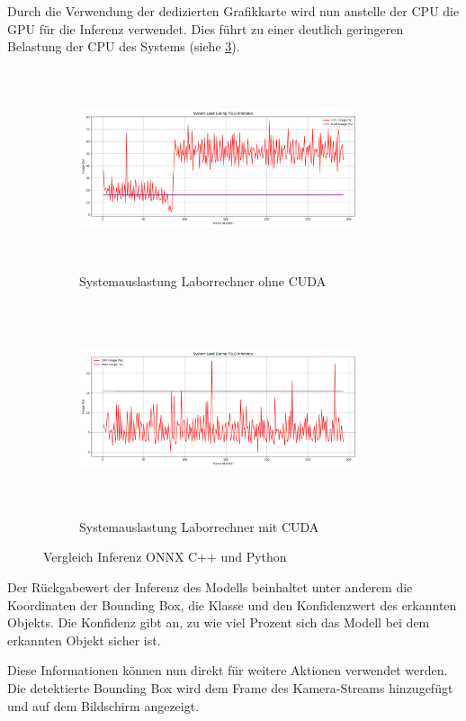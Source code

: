 Durch die Verwendung der dedizierten Grafikkarte wird nun anstelle der CPU die GPU für die Inferenz verwendet. Dies führt zu einer deutlich geringeren Belastung der CPU des Systems (siehe \ref{tab:CPU und RAM-Auslastung CPU vs CUDA}).

\begin{figure}[h!]
\centering
\begin{subfigure}[b]{\textwidth}
  \centering
  \includegraphics[width=0.9\textwidth,height=5.9cm,keepaspectratio]{images/system_load_plot_CPU_Laborrechner.png}
  \caption{Systemauslastung Laborrechner ohne CUDA}
  \label{fig:CPU und RAM-Auslastung ohne CUDA}
\end{subfigure}
\hfill
\begin{subfigure}[b]{\textwidth}
  \centering
  \includegraphics[width=0.9\textwidth,height=6.2cm,keepaspectratio]{images/system_load_plot_CUDA.png}
  \caption{Systemauslastung Laborrechner mit CUDA}
  \label{fig:CPU und RAM-Auslastung mit CUDA}
\end{subfigure}
\caption{Vergleich Inferenz ONNX C++ und Python}
\label{tab:CPU und RAM-Auslastung CPU vs CUDA}
\end{figure}

\newpage

Der Rückgabewert der Inferenz des Modells beinhaltet unter anderem die Koordinaten der Bounding Box, die Klasse und den Konfidenzwert des erkannten Objekts. Die Konfidenz gibt an, zu wie viel Prozent sich das Modell bei dem erkannten Objekt sicher ist. \cite{InferenzResults} 

Diese Informationen können nun direkt für weitere Aktionen verwendet werden. Die detektierte Bounding Box wird dem Frame des Kamera-Streams hinzugefügt und auf dem Bildschirm angezeigt. 